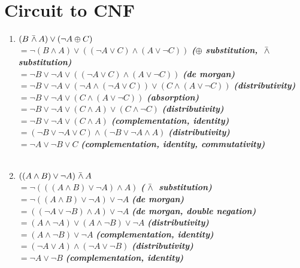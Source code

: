 \documentclass{article}
\newcommand{\lnand}{\bar{\hspace*{0.3em}\land\hspace*{0.2em}}}
\newcommand{\lxor}{\oplus}
\newcommand{\size}[2]{{\fontsize{#1}{0}\selectfont#2}}
\begin{document}
    \section{Circuit to CNF}
    \begin{enumerate}
        \item $(B\lnand A) \lor (\lnot A \lxor C)$ \\
        $= \lnot(B \land A) \lor ((\lnot A \lor C) \land (A \lor \lnot C))$  \textit{\textbf{\size{7}{($\lxor$ substitution, $\lnand$ substitution)}}} \\
        $= \lnot B \lor \lnot A \lor ((\lnot A \lor C) \land (A \lor \lnot C))$ \textit{\textbf{\size{7}{(de morgan)}}} \\
        $= \lnot B \lor \lnot A \lor (\lnot A \land (\lnot A \lor C)) \lor (C \land (A \lor \lnot C))$ \textit{\textbf{\size{7}{(distributivity)}}} \\
        $= \lnot B \lor \lnot A \lor (C \land (A \lor \lnot C))$ \textit{\textbf{\size{7}{(absorption)}}} \\
        $= \lnot B \lor \lnot A \lor (C \land A) \lor (C \land \lnot C)$ \textit{\textbf{\size{7}{(distributivity)}}} \\
        $= \lnot B \lor \lnot A \lor (C \land A)$ \textit{\textbf{\size{7}{(complementation, identity)}}} \\
        $= (\lnot B \lor \lnot A \lor C) \land (\lnot B \lor \lnot A \land A)$ \textit{\textbf{\size{7}{(distributivity)}}} \\
        $= \lnot A \lor \lnot B \lor C$ \textit{\textbf{\size{7}{(complementation, identity, commutativity)}}} \\ \\

        \item $((A \land B) \lor \lnot A) \lnand A$ \\
        $= \lnot(((A \land B) \lor \lnot A) \land A)$ \textit{\textbf{\size{7}{($\lnand$ substitution)}}} \\
        $= \lnot((A \land B) \lor \lnot A) \lor \lnot A$ \textit{\textbf{\size{7}{(de morgan)}}} \\
        $= ((\lnot A \lor \lnot B) \land A) \lor \lnot A$ \textit{\textbf{\size{7}{(de morgan, double negation)}}} \\
        $= (A \land \lnot A) \lor (A \land \lnot B) \lor \lnot A$ \textit{\textbf{\size{7}{(distributivity)}}} \\
        $= (A \land \lnot B) \lor \lnot A$ \textit{\textbf{\size{7}{(complementation, identity)}}} \\
        $= (\lnot A \lor A) \land (\lnot A \lor \lnot B)$ \textit{\textbf{\size{7}{(distributivity)}}} \\
        $= \lnot A \lor \lnot B$ \textit{\textbf{\size{7}{(complementation, identity)}}} \\


\end{enumerate}
\end{document}
